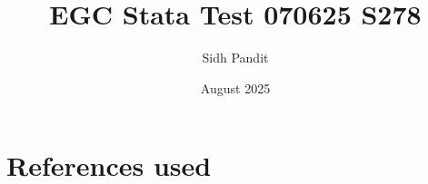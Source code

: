 \documentclass{article}
\title{EGC Stata Test 070625 S278}
\author{Sidh Pandit}
\date{August 2025}
\begin{document}
\maketitle





\section{References used}
\end{document}

